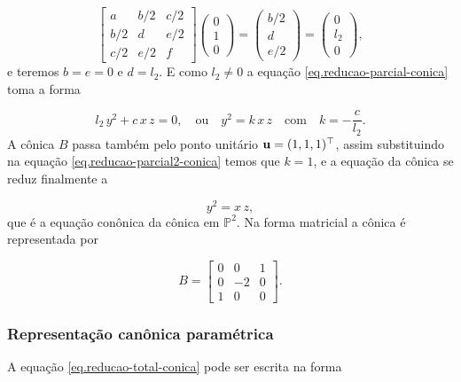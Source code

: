 \begin{equation*}
\begin{bmatrix}
a&b/2&c/2\\
b/2&d&e/2\\
c/2&e/2&f
\end{bmatrix}
\begin{pmatrix}
0\\
1\\
0
\end{pmatrix}
=
\begin{pmatrix}
b/2\\
d\\
e/2
\end{pmatrix}
=
\begin{pmatrix}
0\\
l_2\\
0
\end{pmatrix},
\end{equation*}
e teremos $b=e=0$ e $d=l_2$.
E como $l_2 \neq 0$ a equação \ref{eq.reducao-parcial-conica} toma a forma

\begin{equation}\label{eq.reducao-parcial2-conica}
l_2\,y^2+c\,x\,z=0,\quad\text{ou}\quad y^2=k\,x\,z\quad\text{com}\quad k=-\frac{c}{l_2}.
\end{equation}
A cônica $B$ passa também pelo ponto unitário ${\bf u}=(1,1,1)^\top$, assim substituindo na equação \ref{eq.reducao-parcial2-conica} temos que $k=1$, e a equação da cônica se reduz finalmente a 

\begin{equation}\label{eq.reducao-total-conica}
y^2=x\,z,
\end{equation}
que é a equação conônica da cônica em $\mathbb{P}^2$. Na forma matricial a cônica é representada por 

\begin{equation*}
B=
\begin{bmatrix}
0&0&1\\
0&-2&0\\
1&0&0
\end{bmatrix}.
\end{equation*}

\subsubsection{Representação canônica paramétrica}\label{sec.repre-canonica-parametrica}
A equação \ref{eq.reducao-total-conica} pode ser escrita na forma 

